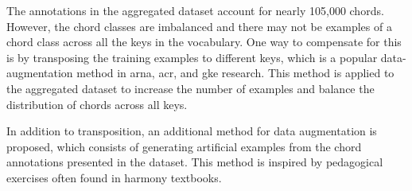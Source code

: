 
The annotations in the aggregated dataset account for nearly
105,000 chords. However, the chord classes are imbalanced
and there may not be examples of a chord class across all
the keys in the vocabulary. One way to compensate for this
is by transposing the training examples to different keys,
which is a popular data-augmentation method in \gls{arna},
\gls{acr}, and \gls{gke} research. This method is applied to
the aggregated dataset to increase the number of examples
and balance the distribution of chords across all keys.

In addition to transposition, an additional method for data
augmentation is proposed, which consists of generating
artificial examples from the chord annotations presented in
the dataset. This method is inspired by pedagogical
exercises often found in harmony textbooks.
